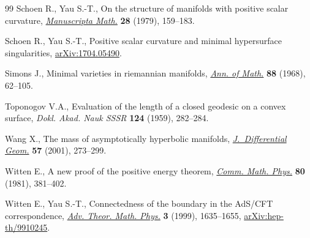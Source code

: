 \documentclass[pdftex]{sigma}
\numberwithin{equation}{section}
\theoremstyle{definition}
\begin{document}
\begin{thebibliography}{99}
Schoen R., Yau S.-T., On the structure of manifolds with positive scalar
 curvature, \href{https://doi.org/10.1007/BF01647970}{\textit{Manuscripta Math.}} \textbf{28} (1979), 159--183.

Schoen R., Yau S.-T., Positive scalar curvature and minimal hypersurface
 singularities, \href{https://arxiv.org/abs/1704.05490}{arXiv:1704.05490}.

Simons J., Minimal varieties in riemannian manifolds, \href{https://doi.org/10.2307/1970556}{\textit{Ann. of Math.}}
 \textbf{88} (1968), 62--105.

Toponogov V.A., Evaluation of the length of a closed geodesic on a convex
 surface, \textit{Dokl. Akad. Nauk SSSR} \textbf{124} (1959), 282--284.

Wang X., The mass of asymptotically hyperbolic manifolds,
 \href{https://doi.org/10.4310/jdg/1090348112}{\textit{J.~Differential Geom.}} \textbf{57} (2001), 273--299.

Witten E., A new proof of the positive energy theorem, \href{https://doi.org/10.1007/BF01208277}{\textit{Comm. Math.
 Phys.}} \textbf{80} (1981), 381--402.

Witten E., Yau S.-T., Connectedness of the boundary in the {A}d{S}/{CFT}
 correspondence, \href{https://doi.org/10.4310/ATMP.1999.v3.n6.a1}{\textit{Adv. Theor. Math. Phys.}} \textbf{3} (1999),
 1635--1655, \href{https://arxiv.org/abs/hep-th/9910245}{arXiv:hep-th/9910245}.

\end{thebibliography}\LastPageEnding
\end{document}

